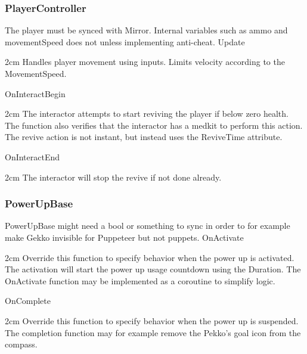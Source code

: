 \documentclass[11pt]{article}
\newenvironment{indentall}{\begin{adjustwidth}{2cm}{}}{\end{adjustwidth}}
\begin{document}
\subsubsection{PlayerController}
The player must be synced with Mirror. Internal variables such as ammo and movementSpeed does not unless implementing anti-cheat.
\newline 
\newline Update
\begin{indentall}
Handles player movement using inputs. Limits velocity according to the MovementSpeed. 
\end{indentall}
OnInteractBegin
\begin{indentall}
The interactor attempts to start reviving the player if below zero health. The function also verifies that the interactor has a medkit to perform this action. The revive action is not instant, but instead uses the ReviveTime attribute.
\end{indentall}
OnInteractEnd
\begin{indentall}
The interactor will stop the revive if not done already.
\end{indentall}

\subsubsection{PowerUpBase}
PowerUpBase might need a bool or something to sync in order to for example make Gekko invisible for Puppeteer but not puppets.
\newline 
\newline OnActivate
\begin{indentall}
Override this function to specify behavior when the power up is activated. The activation will start the power up usage countdown using the Duration. The OnActivate function may be implemented as a coroutine to simplify logic.
\end{indentall}
OnComplete
\begin{indentall}
Override this function to specify behavior when the power up is suspended. The completion function may for example remove the Pekko’s goal icon from the compass.
\end{indentall}
\end{document}

